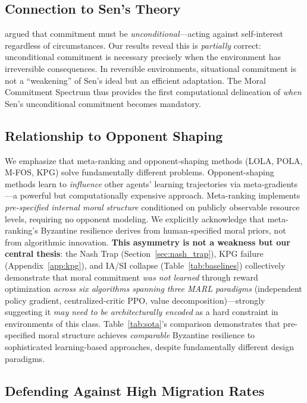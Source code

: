 \documentclass{article}
\begin{document}
\subsection{Connection to Sen's Theory}

\citet{sen1977rational} argued that commitment must be \emph{unconditional}---acting against self-interest regardless of circumstances.
Our results reveal this is \emph{partially} correct: unconditional commitment is necessary precisely when the environment has irreversible consequences.
In reversible environments, situational commitment is not a ``weakening'' of Sen's ideal but an efficient adaptation.
The Moral Commitment Spectrum thus provides the first computational delineation of \emph{when} Sen's unconditional commitment becomes mandatory.

\subsection{Relationship to Opponent Shaping}

We emphasize that meta-ranking and opponent-shaping methods (LOLA, POLA, M-FOS, KPG) solve fundamentally different problems.
Opponent-shaping methods learn to \emph{influence} other agents' learning trajectories via meta-gradients---a powerful but computationally expensive approach.
Meta-ranking implements \emph{pre-specified internal moral structure} conditioned on publicly observable resource levels, requiring no opponent modeling.
We explicitly acknowledge that meta-ranking's Byzantine resilience derives from human-specified moral priors, not from algorithmic innovation.
\textbf{This asymmetry is not a weakness but our central thesis}: the Nash Trap (Section~\ref{sec:nash_trap}), KPG failure (Appendix~\ref{app:kpg}), and IA/SI collapse (Table~\ref{tab:baselines}) collectively demonstrate that moral commitment \emph{was not learned} through reward optimization \emph{across six algorithms spanning three MARL paradigms} (independent policy gradient, centralized-critic PPO, value decomposition)---strongly suggesting it \emph{may need to be architecturally encoded} as a hard constraint in environments of this class.
Table~\ref{tab:sota}'s comparison demonstrates that pre-specified moral structure achieves \emph{comparable} Byzantine resilience to sophisticated learning-based approaches, despite fundamentally different design paradigms.

\subsection{Defending Against High Migration Rates}
\label{sec:migration}
\end{document}
